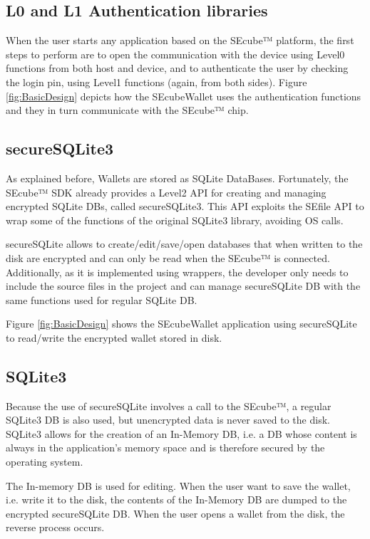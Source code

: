 \subsection{L0 and L1 Authentication libraries}

When the user starts any application based on the SEcube™ platform, the first steps to perform are to open the communication with the device using Level0 functions from both host and device, and to authenticate the user by checking the login pin, using Level1 functions (again, from both sides). Figure \ref{fig:BasicDesign} depicts how the SEcubeWallet uses the authentication functions and they in turn communicate with the SEcube™ chip.

\subsection{secureSQLite3}
As explained before, Wallets are stored as SQLite DataBases. Fortunately, the SEcube™ SDK already provides a Level2 API for creating and managing encrypted SQLite DBs, called secureSQLite3. This API exploits the SEfile API to wrap some of the functions of the original SQLite3 library, avoiding OS calls.

secureSQLite allows to create/edit/save/open databases that when written to the disk are encrypted and can only be read when the SEcube™ is connected. Additionally, as it is implemented using wrappers, the developer only needs to include the source files in the project and can manage secureSQLite DB with the same functions used for regular SQLite DB. %

Figure \ref{fig:BasicDesign} shows the SEcubeWallet application using secureSQLite to read/write the encrypted wallet stored in disk.

\subsection{SQLite3}
Because the use of secureSQLite involves a call to the SEcube™, a regular SQLite3 DB is also used, but unencrypted data is never saved to the disk. SQLite3 allows for the creation of an In-Memory DB, i.e. a DB whose content is always in the application's memory space and is therefore secured by the operating system. 

The In-memory DB is used for editing. When the user want to save the wallet, i.e. write it to the disk, the contents of the In-Memory DB are dumped to the encrypted secureSQLite DB. When the user opens a wallet from the disk, the reverse process occurs.

